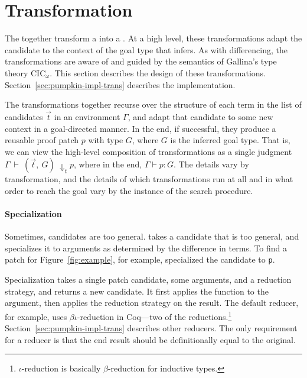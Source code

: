 \section{Transformation}
\label{sec:pumpkin-trans}

The  together transform a  into a .
At a high level, these transformations adapt the candidate to the context of the goal type that \sysname infers.
As with differencing, the transformations are aware of and guided by the semantics of Gallina's type theory CIC$_{\omega}$.
This section describes the design of these transformations.
Section~\ref{sec:pumpkin-impl-trans} describes the implementation.

The transformations together recurse over the structure of each term in the list of candidates $\vec{t}$ in an environment $\Gamma$,
and adapt that candidate to some new context in a goal-directed manner.
In the end, if successful, they produce a reusable proof patch $p$ with type $G$, where $G$ is the inferred goal type.
That is, we can view the high-level composition of transformations as a single judgment
$\Gamma\ \vdash\ (\vec{t},\ G)\ \Downarrow_{t} p$, where in the end, $\Gamma \vdash p : G$. 
The details vary by transformation,
and the details of which transformations run at all and in what order to reach the goal vary by the instance
of the search procedure.


\paragraph{Specialization}
Sometimes, candidates are too general.
 takes a candidate that is too general,
and specializes it to arguments as determined by the difference in terms.
To find a patch for Figure~\ref{fig:example}, for example, \sysname
specialized the candidate to \lstinline{p}.

Specialization takes a single patch candidate, some arguments, and a reduction strategy, and returns a new candidate.
It first applies the function to the argument, then applies the reduction strategy on the result.
The default reducer, for example, uses $\beta\iota$-reduction in Coq---two of the  reductions.\footnote{$\iota$-reduction is basically $\beta$-reduction for inductive types.}
Section~\ref{sec:pumpkin-impl-trans} describes other reducers.
The only requirement for a reducer is that the end result should be definitionally equal to the original.

